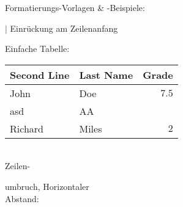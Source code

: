 \documentclass{article}
\begin{document}
Formatierungs-Vorlagen \& -Beispiele:

\indent $|$ Einrückung am Zeilenanfang

Einfache Tabelle:

\begin{tabular}{l|l|r}
Second Line & Last Name & Grade \\
\hline
John & Doe & $7.5$ \\
\cmidrule{2-3}
asd & AA & \\
\midrule
Richard & Miles & $2$ \\
\end{tabular}

\ \\[2em]
Zeilen-

umbruch, Horizontaler
\ \\[2em]
Abstand:

\end{document}
